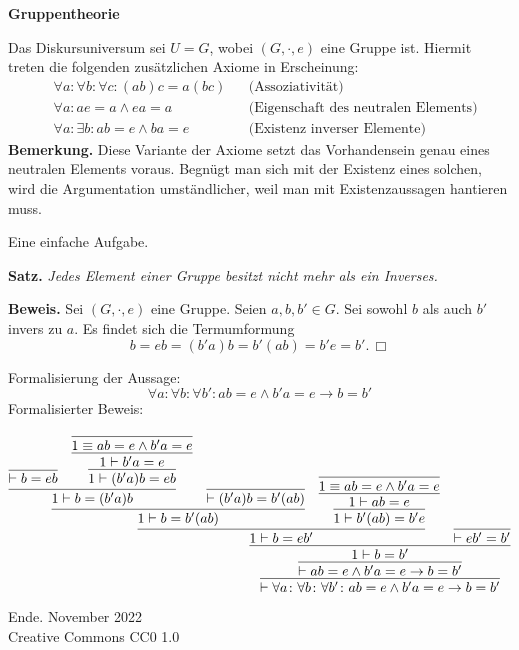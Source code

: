 \documentclass[8pt]{beamer}
\newcommand{\modest}[1]{{\small\color{gray}#1}}
\newcommand{\strong}[1]{\textsf{\textbf{#1}}}
\renewcommand{\qedsymbol}{\ensuremath{\Box}}
\newcommand{\centerheadline}[1]{%
  \begin{center}\strong{#1}\end{center}}
\newcommand{\parspace}{\vspace{0.8em}}
\newcommand{\cond}{\rightarrow}
\begin{document}
\begin{frame}
\centerheadline{Gruppentheorie}
\end{frame}

\begin{frame}
Das Diskursuniversum sei $U=G$, wobei $(G,\cdot,e)$ eine Gruppe ist.
Hiermit treten die folgenden zusätzlichen Axiome in Erscheinung:
\begin{align*}
& \forall a\colon\forall b\colon\forall c\colon (ab)c = a(bc) && \text{(Assoziativität)}\\
& \forall a\colon ae = a\land ea = a && \text{(Eigenschaft des neutralen Elements)}\\
& \forall a\colon\exists b\colon ab = e\land ba = e && \text{(Existenz inverser Elemente)}
\end{align*}\pause
{\footnotesize\strong{Bemerkung.} Diese Variante der Axiome setzt
das Vorhandensein genau eines neutralen Elements voraus. Begnügt man
sich mit der Existenz eines solchen, wird die Argumentation umständlicher,
weil man mit Existenzaussagen hantieren muss.}
\end{frame}

\begin{frame}
Eine einfache Aufgabe.

\vspace{1em}
\strong{Satz.} \emph{Jedes Element einer Gruppe besitzt nicht mehr
als ein Inverses.}\pause

\parspace
\strong{Beweis.}
Sei $(G,\cdot,e)$ eine Gruppe. Seien $a,b,b'\in G$.
Sei sowohl $b$ als auch $b'$ invers zu $a$. Es findet sich die
Termumformung
\[b = eb = (b'a)b = b'(ab) = b'e = b'.\,\qedsymbol\]
\end{frame}

\begin{frame}
Formalisierung der Aussage:
\[\forall a\colon\forall b\colon\forall b'\colon ab=e\land b'a=e\cond b=b'\]\pause
Formalisierter Beweis:

\begin{small}
\[
\infer{\vdash\forall a\colon\forall b\colon\forall b'\colon ab=e\land b'a=e\cond b=b'}{
  \infer{\vdash ab=e\land b'a=e\cond b=b'}{
    \infer{1\vdash b=b'}{
      \infer{1\vdash b=eb'}{
        \infer{1\vdash b=b'(ab)}{
          \infer{1\vdash b=(b'a)b}{
            \infer{\vdash b=eb}{}
          & \infer{1\vdash (b'a)b=eb}{
              \infer{1\vdash b'a=e}{
                \infer{1\equiv ab=e\land b'a=e}{}}}
          }
        & \infer{\vdash (b'a)b = b'(ab)}{}
        }
      & \infer{1\vdash b'(ab)=b'e}{
            \infer{1\vdash ab=e}{
              \infer{1\equiv ab=e\land b'a=e}{}}}
      }
    & \infer{\vdash eb'=b'}{}}}}
\]
\end{small}
\end{frame}

\begin{frame}
Ende.
\vfill\hfill\modest{November 2022}\\
\hfill\modest{Creative Commons CC0 1.0}
\end{frame}
\end{document}
